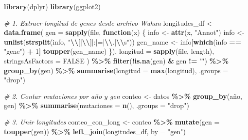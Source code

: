 \documentclass[
]{article}
\newenvironment{Shaded}{\begin{snugshade}}{\end{snugshade}}
\newcommand{\AttributeTok}[1]{\textcolor[rgb]{0.13,0.29,0.53}{#1}}
\newcommand{\CommentTok}[1]{\textcolor[rgb]{0.56,0.35,0.01}{\textit{#1}}}
\newcommand{\ConstantTok}[1]{\textcolor[rgb]{0.56,0.35,0.01}{#1}}
\newcommand{\ControlFlowTok}[1]{\textcolor[rgb]{0.13,0.29,0.53}{\textbf{#1}}}
\newcommand{\DecValTok}[1]{\textcolor[rgb]{0.00,0.00,0.81}{#1}}
\newcommand{\FunctionTok}[1]{\textcolor[rgb]{0.13,0.29,0.53}{\textbf{#1}}}
\newcommand{\NormalTok}[1]{#1}
\newcommand{\OtherTok}[1]{\textcolor[rgb]{0.56,0.35,0.01}{#1}}
\newcommand{\SpecialCharTok}[1]{\textcolor[rgb]{0.81,0.36,0.00}{\textbf{#1}}}
\newcommand{\StringTok}[1]{\textcolor[rgb]{0.31,0.60,0.02}{#1}}
\begin{document}
\begin{Shaded}
\begin{Highlighting}[]
\FunctionTok{library}\NormalTok{(dplyr)}
\FunctionTok{library}\NormalTok{(ggplot2)}

\CommentTok{\# 1. Extraer longitud de genes desde archivo Wuhan}
\NormalTok{longitudes\_df }\OtherTok{\textless{}{-}} \FunctionTok{data.frame}\NormalTok{(}
  \AttributeTok{gen =} \FunctionTok{sapply}\NormalTok{(file, }\ControlFlowTok{function}\NormalTok{(x) \{}
\NormalTok{    info }\OtherTok{\textless{}{-}} \FunctionTok{attr}\NormalTok{(x, }\StringTok{"Annot"}\NormalTok{)}
\NormalTok{    info }\OtherTok{\textless{}{-}} \FunctionTok{unlist}\NormalTok{(}\FunctionTok{strsplit}\NormalTok{(info, }\StringTok{"}\SpecialCharTok{\textbackslash{}\textbackslash{}}\StringTok{[|}\SpecialCharTok{\textbackslash{}\textbackslash{}}\StringTok{]|:|=|}\SpecialCharTok{\textbackslash{}\textbackslash{}}\StringTok{.|}\SpecialCharTok{\textbackslash{}\textbackslash{}}\StringTok{s"}\NormalTok{))}
\NormalTok{    gen\_name }\OtherTok{\textless{}{-}}\NormalTok{ info[}\FunctionTok{which}\NormalTok{(info }\SpecialCharTok{==} \StringTok{"gene"}\NormalTok{) }\SpecialCharTok{+} \DecValTok{1}\NormalTok{]}
    \FunctionTok{toupper}\NormalTok{(gen\_name)}
\NormalTok{  \}),}
  \AttributeTok{longitud =} \FunctionTok{sapply}\NormalTok{(file, length),}
  \AttributeTok{stringsAsFactors =} \ConstantTok{FALSE}
\NormalTok{) }\SpecialCharTok{\%\textgreater{}\%}
  \FunctionTok{filter}\NormalTok{(}\SpecialCharTok{!}\FunctionTok{is.na}\NormalTok{(gen) }\SpecialCharTok{\&}\NormalTok{ gen }\SpecialCharTok{!=} \StringTok{""}\NormalTok{) }\SpecialCharTok{\%\textgreater{}\%}
  \FunctionTok{group\_by}\NormalTok{(gen) }\SpecialCharTok{\%\textgreater{}\%}
  \FunctionTok{summarise}\NormalTok{(}\AttributeTok{longitud =} \FunctionTok{max}\NormalTok{(longitud), }\AttributeTok{.groups =} \StringTok{"drop"}\NormalTok{)}

\CommentTok{\# 2. Contar mutaciones por año y gen}
\NormalTok{conteo }\OtherTok{\textless{}{-}}\NormalTok{ datos }\SpecialCharTok{\%\textgreater{}\%}
  \FunctionTok{group\_by}\NormalTok{(año, gen) }\SpecialCharTok{\%\textgreater{}\%}
  \FunctionTok{summarise}\NormalTok{(}\AttributeTok{mutaciones =} \FunctionTok{n}\NormalTok{(), }\AttributeTok{.groups =} \StringTok{"drop"}\NormalTok{)}

\CommentTok{\# 3. Unir longitudes}
\NormalTok{conteo\_con\_long }\OtherTok{\textless{}{-}}\NormalTok{ conteo }\SpecialCharTok{\%\textgreater{}\%}
  \FunctionTok{mutate}\NormalTok{(}\AttributeTok{gen =} \FunctionTok{toupper}\NormalTok{(gen)) }\SpecialCharTok{\%\textgreater{}\%}
  \FunctionTok{left\_join}\NormalTok{(longitudes\_df, }\AttributeTok{by =} \StringTok{"gen"}\NormalTok{)}


\end{Highlighting}
\end{Shaded}
\end{document}
